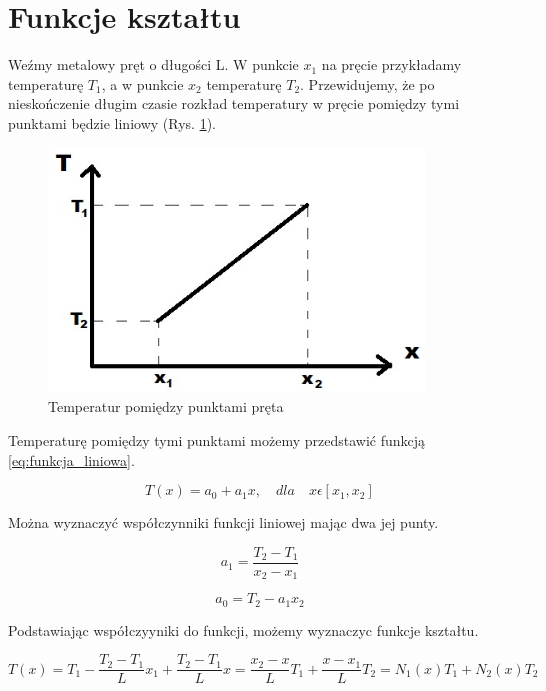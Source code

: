 
\section{Funkcje kształtu}
\label{sec:funkcje_ksztaltu}

Weźmy metalowy pręt o długości L. W punkcie \(x_1\) na pręcie przykładamy temperaturę \( T_1 \), a w punkcie \(x_2\) temperaturę \( T_2 \). Przewidujemy, że po nieskończenie długim czasie rozkład temperatury w pręcie pomiędzy tymi punktami będzie liniowy (Rys. \ref{fig:temperatura_pret}).

\begin{figure}[h]
\centering
\includegraphics[width=10cm]{Zdjecia/3/rozklad_temperatury}
\caption{Temperatur pomiędzy punktami pręta}
\label{fig:temperatura_pret}
\end{figure}

Temperaturę pomiędzy tymi punktami możemy przedstawić funkcją \ref{eq:funkcja_liniowa}.

\begin{equation} \label{eq:funkcja_liniowa}
T(x)=a_0 + a_1 x, \quad dla \quad x \epsilon [x_1, x_2]
\end{equation}

Można wyznaczyć współczynniki funkcji liniowej mając dwa jej punty.

\begin{equation}
a_1 = \frac{T_2 - T_1}{x_2 - x_1}
\end{equation}

\begin{equation}
a_0 = T_2 - a_1 x_2
\end{equation}

Podstawiając współczyyniki do funkcji, możemy wyznaczyc funkcje kształtu.

\begin{equation}
T(x) = T_1 - \frac{T_2 - T_1}{L} x_1 + \frac{T_2 - T_1}{L} x = \frac{x_2 - x}{L}T_1 + \frac{x - x_1}{L}T_2 = N_1(x)T_1 + N_2(x)T_2
\end{equation}

